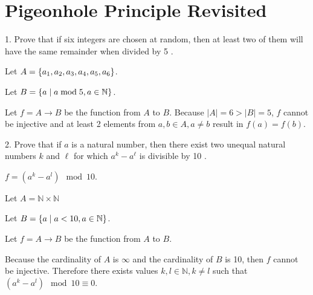 \documentclass{article}
\begin{document}
\section{Pigeonhole Principle Revisited}

\begin{exercise}{}{}
	{1. Prove that if six integers are chosen at random, then at
		least two of them will have the same remainder when divided by 5 .}
	\begin{alist}
		\item Let $A=\{a_1, a_2, a_3, a_4, a_5, a_6\}$.
		\item Let $B=\{a\mid a \bmod 5, a\in\mathbb{N}\}$.
		\item Let $f=A\rightarrow B$ be the function from $A$ to $B$.  Because
		$|A|=6>|B|=5$, $f$ cannot be injective and at least 2 elements from $a, b\in
			A, a\neq b$ result in $f(a)=f(b)$.
		\item
	\end{alist}
\end{exercise}{}{}

\begin{exercise}{}{}
	{2. Prove that if $a$ is a natural number, then there exist two
		unequal natural numbers $k$ and $\ell$ for which $a^k-a^{\ell}$ is divisible
		by 10 .}
	\begin{alist}
		\item $f = (a^k - a^l) \mod 10$.
		\item Let $A=\mathbb{N}\times\mathbb{N}$
		\item Let $B=\{a\mid a<10, a\in\mathbb{N}\}$.
		\item Let $f=A\rightarrow B$ be the function from $A$ to $B$.
		\item Because the cardinality of $A$ is $\infty$ and the cardinality of $B$
		is 10, then $f$ cannot be injective. Therefore there exists values $k,
			l\in\mathbb{N}, k\neq l$ such that $(a^k-a^l)\mod 10\equiv 0$.
		\item
	\end{alist}
\end{exercise}{}{}
\end{document}
